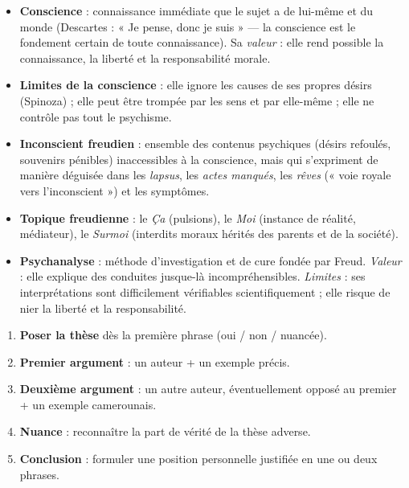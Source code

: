 \documentclass[11pt]{article}
\begin{document}
\begin{aretenir}
\begin{itemize}
\item \textbf{Conscience} : connaissance immédiate que le sujet a de lui-même et du monde (Descartes : « Je pense, donc je suis » — la conscience est le fondement certain de toute connaissance). Sa \emph{valeur} : elle rend possible la connaissance, la liberté et la responsabilité morale.
\item \textbf{Limites de la conscience} : elle ignore les causes de ses propres désirs (Spinoza) ; elle peut être trompée par les sens et par elle-même ; elle ne contrôle pas tout le psychisme.
\item \textbf{Inconscient freudien} : ensemble des contenus psychiques (désirs refoulés, souvenirs pénibles) inaccessibles à la conscience, mais qui s'expriment de manière déguisée dans les \emph{lapsus}, les \emph{actes manqués}, les \emph{rêves} (« voie royale vers l'inconscient ») et les symptômes.
\item \textbf{Topique freudienne} : le \emph{Ça} (pulsions), le \emph{Moi} (instance de réalité, médiateur), le \emph{Surmoi} (interdits moraux hérités des parents et de la société).
\item \textbf{Psychanalyse} : méthode d'investigation et de cure fondée par Freud. \emph{Valeur} : elle explique des conduites jusque-là incompréhensibles. \emph{Limites} : ses interprétations sont difficilement vérifiables scientifiquement ; elle risque de nier la liberté et la responsabilité.
\end{itemize}
\end{aretenir}

\begin{methode}
\begin{enumerate}
\item \textbf{Poser la thèse} dès la première phrase (oui / non / nuancée).
\item \textbf{Premier argument} : un auteur + un exemple précis.
\item \textbf{Deuxième argument} : un autre auteur, éventuellement opposé au premier + un exemple camerounais.
\item \textbf{Nuance} : reconnaître la part de vérité de la thèse adverse.
\item \textbf{Conclusion} : formuler une position personnelle justifiée en une ou deux phrases.
\end{enumerate}
\end{methode}
\end{document}

